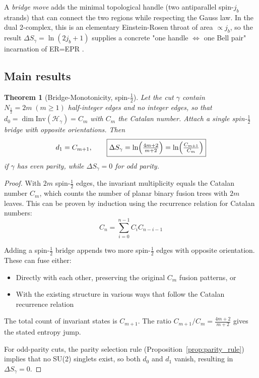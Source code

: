 \documentclass[11pt, a4paper]{article}
\theoremstyle{plain}
\newtheorem{theorem}{Theorem}[section]
\theoremstyle{definition}
\theoremstyle{remark}
\newcommand{\Hil}{\mathcal{H}}
\newcommand{\Inv}{\mathrm{Inv}}
\begin{document}
A \emph{bridge move} adds the minimal topological handle (two antiparallel spin-$j_b$ strands) that can connect the two regions while respecting the Gauss law. In the dual 2-complex, this is an elementary Einstein-Rosen throat of area $\propto j_b$, so the result $\Delta S_{\gamma}=\ln(2j_b+1)$ supplies a concrete "one handle $\Leftrightarrow$ one Bell pair" incarnation of ER=EPR \cite{MaldacenaSusskind2013}.

\subsection{Main results}

\begin{theorem}[Bridge-Monotonicity, spin-$\tfrac12$]
\label{thm:main}
Let the cut $\gamma$ contain $N_{\tfrac12}=2m\;(m\!\ge\!1)$ half-integer edges and no integer edges, so that
\(
  d_0=\dim\Inv(\Hil_{\gamma})=C_m
\)
with $C_m$ the Catalan number.
Attach a single spin-$\tfrac12$ bridge with opposite orientations.
Then
\[  d_1 = C_{m+1},\qquad  \boxed{    \Delta S_{\gamma}      =\ln\Bigl(\tfrac{4m+2}{m+2}\Bigr)      =\ln\Bigl(\tfrac{C_{m+1}}{C_m}\Bigr)}\]
if $\gamma$ has even parity, while $\Delta S_{\gamma}=0$ for odd parity.
\end{theorem}

\begin{proof}
With $2m$ spin-$\frac{1}{2}$ edges, the invariant multiplicity equals the Catalan number $C_m$, which counts the number of planar binary fusion trees with $2m$ leaves. This can be proven by induction using the recurrence relation for Catalan numbers:
\begin{equation}
C_n = \sum_{i=0}^{n-1} C_i C_{n-i-1}
\end{equation}

Adding a spin-$\frac{1}{2}$ bridge appends two more spin-$\frac{1}{2}$ edges with opposite orientation. These can fuse either:
\begin{itemize}
\item Directly with each other, preserving the original $C_m$ fusion patterns, or
\item With the existing structure in various ways that follow the Catalan recurrence relation
\end{itemize}

The total count of invariant states is $C_{m+1}$. The ratio $C_{m+1}/C_m = \frac{4m+2}{m+2}$ gives the stated entropy jump.

For odd-parity cuts, the parity selection rule (Proposition~\ref{prop:parity_rule}) implies that no SU(2) singlets exist, so both $d_0$ and $d_1$ vanish, resulting in $\Delta S_{\gamma} = 0$.
\end{proof}
\end{document}
